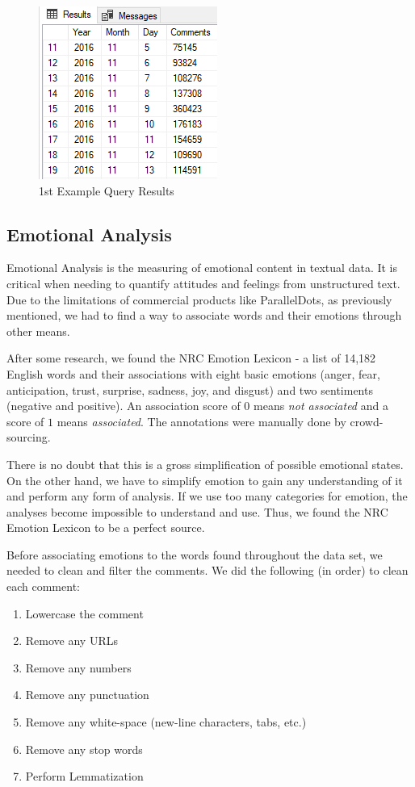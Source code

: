 \documentclass[letterpaper]{article}
\begin{document}
\begin{figure}[!htb]
\begin{center}
\includegraphics[scale=0.7]{example_query_result.PNG}
\caption{1st Example Query Results}
\label{fig1}
\end{center}
\end{figure}



\subsection{Emotional Analysis}
Emotional Analysis is the measuring of emotional content in textual data. It is critical when needing to quantify attitudes and feelings from unstructured text. Due to the limitations of commercial products like ParallelDots, as previously mentioned, we had to find a way to associate words and their emotions through other means.

After some research, we found the NRC Emotion Lexicon - a list of 14,182 English words and their associations with eight basic emotions (anger, fear, anticipation, trust, surprise, sadness, joy, and disgust) and two sentiments (negative and positive). An association score of $0$ means \textit{not associated} and a score of $1$ means \textit{associated}. The annotations were manually done by crowd-sourcing.

There is no doubt that this is a gross simplification of possible emotional states. On the other hand, we have to simplify emotion to gain any understanding of it and perform any form of analysis. If we use too many categories for emotion, the analyses become impossible to understand and use. Thus, we found the NRC Emotion Lexicon to be a perfect source.

Before associating emotions to the words found throughout the data set, we needed to clean and filter the comments. We did the following (in order) to clean each comment:
\begin{enumerate}
    \item Lowercase the comment
    \item Remove any URLs
    \item Remove any numbers
    \item Remove any punctuation
    \item Remove any white-space (new-line characters, tabs, etc.)
    \item Remove any stop words
    \item Perform Lemmatization
\end{enumerate}
\end{document}
